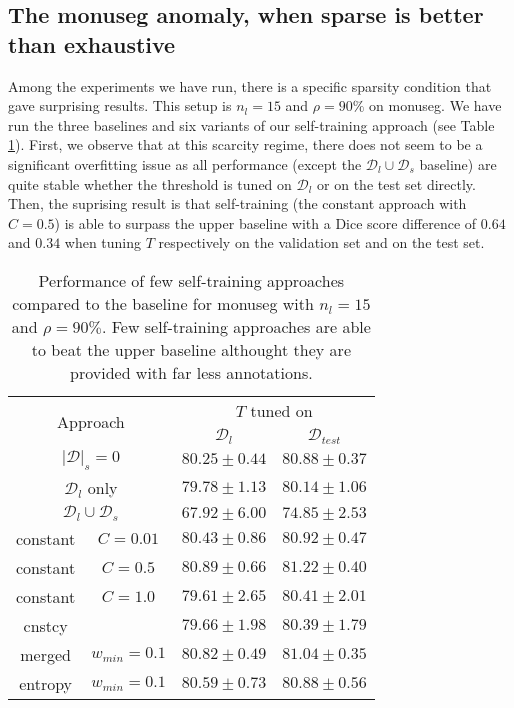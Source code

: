 \subsection{The \acrshort{monuseg} anomaly, when sparse is better than exhaustive}
\label{ssec:strain:monuseganomaly}


Among the experiments we have run, there is a specific sparsity condition that gave surprising results. This setup is $n_l = 15$ and $\rho = 90\%$ on \acrshort{monuseg}. We have run the three baselines and six variants of our self-training approach (see Table \ref{tab:strain:monuseganomaly}). First, we observe that at this scarcity regime, there does not seem to be a significant overfitting issue as all performance (except the $\mathcal{D}_l \cup \mathcal{D}_s$ baseline) are quite stable whether the threshold is tuned on $\mathcal{D}_l$ or on the test set directly. Then, the suprising result is that self-training (\ie the constant approach with $C=0.5$) is able to surpass the upper baseline with a Dice score difference of $0.64$ and $0.34$ when tuning $T$ respectively on the validation set and on the test set.  

\begin{table}
  \centering
  \begin{tabular}{|cc|c|c|}
    \hline
    \multicolumn{2}{|c|}{\multirow{2}{*}{Approach}} &  \multicolumn{2}{c|}{$T$ tuned on} \\
    \multicolumn{2}{|c|}{} & $\mathcal{D}_l$ & $\mathcal{D}_{test}$ \\ 
    \hline
    \multicolumn{2}{|c|}{$|\mathcal{D}|_s = 0$} & $80.25 \pm 0.44$ & $80.88 \pm 0.37$ \\
    \multicolumn{2}{|c|}{$\mathcal{D}_l$ only} & $79.78 \pm 1.13$ & $80.14 \pm 1.06$ \\
    \multicolumn{2}{|c|}{$\mathcal{D}_l \cup \mathcal{D}_s$} & $67.92 \pm 6.00$ & $74.85 \pm 2.53$ \\
    \hline
    constant & $C=0.01$ & $80.43 \pm 0.86$ & $80.92 \pm 0.47$ \\
    constant & $C=0.5$ & $80.89 \pm 0.66$ & $81.22 \pm 0.40$ \\
    constant & $C=1.0$ & $79.61 \pm 2.65$ & $80.41 \pm 2.01$ \\
    cnstcy & & $79.66 \pm 1.98$ & $80.39 \pm 1.79$ \\
    merged & $w_{min}=0.1$ & $80.82 \pm 0.49$ & $81.04 \pm 0.35$ \\
    entropy & $w_{min}=0.1$ & $80.59 \pm 0.73$ & $80.88 \pm 0.56$ \\
    \hline
  \end{tabular}
  \caption{Performance of few self-training approaches compared to the baseline for \acrshort{monuseg} with $n_l = 15$ and $\rho = 90\%$. Few self-training approaches are able to beat the upper baseline althought they are provided with far less annotations.}
  \label{tab:strain:monuseganomaly}
\end{table}

